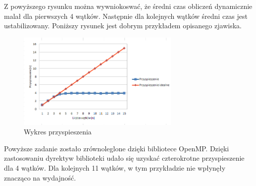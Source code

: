 \documentclass[a4paper,10pt]{article}
\begin{document}
Z powyższego rysunku można wywniokoswać, że średni czas obliczeń dynamicznie malał dla pierwszych 4 wątków. Następnie dla kolejnych wątków średni czas jest ustabilizowany.
Poniższy rysunek jest dobrym przykładem opisanego zjawiska.

\begin{figure}[ht]
	\centering
  \includegraphics[width=0.7\textwidth]{2.png}
  \caption{Wykres przyspieszenia}
\end{figure}

Powyższe zadanie zostało zrównoleglone dzięki bibliotece OpenMP. Dzięki zastosowaniu dyrektyw biblioteki udało się uzyskać czterokrotne przyspieszenie dla 4 wątków. Dla kolejnych 11 wątków, w tym przykładzie nie wpłynęły znacząco na wydajność.
\end{document}
